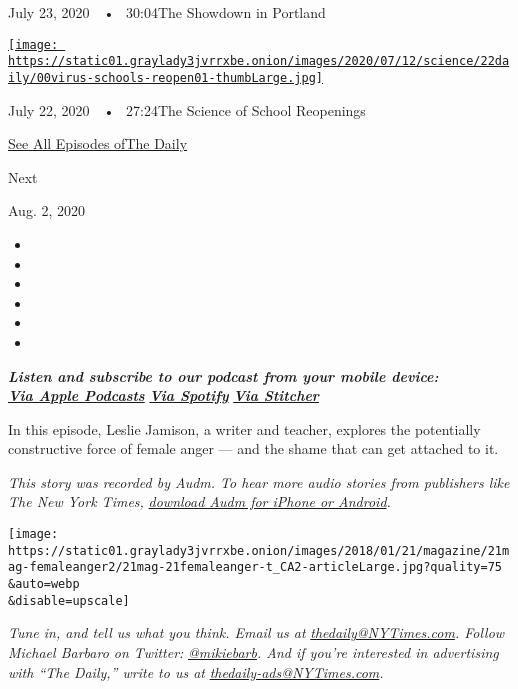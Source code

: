 July 23, 2020~~•~ 30:04The Showdown in Portland

\href{https://www.nytimes3xbfgragh.onion/2020/07/22/podcasts/the-daily/school-reopenings-coronavirus.html?action=click\&module=audio-series-bar\&region=header\&pgtype=Article}{\texttt{[image: https://static01.graylady3jvrrxbe.onion/images/2020/07/12/science/22daily/00virus-schools-reopen01-thumbLarge.jpg]}}

July 22, 2020~~•~ 27:24The Science of School Reopenings

\href{https://www.nytimes3xbfgragh.onion/column/the-daily}{See All
Episodes ofThe Daily}

Next

Aug. 2, 2020

\begin{itemize}
\item
\item
\item
\item
\item
\item
\end{itemize}

\emph{\textbf{Listen and subscribe to our podcast from your mobile
device:}}\\
\textbf{\href{https://itunes.apple.com/us/podcast/the-daily/id1200361736?mt=2}{\emph{Via
Apple Podcasts}}} \emph{\textbf{\textbar{}}}
\textbf{\href{https://open.spotify.com/show/3IM0lmZxpFAY7CwMuv9H4g?si=SfuMSC55R1qprFsRZU3_zw}{\emph{Via
Spotify}}} \emph{\textbf{\textbar{}}}
\textbf{\href{http://www.stitcher.com/podcast/the-new-york-times/the-daily-10}{\emph{Via
Stitcher}}}

In this episode, Leslie Jamison, a writer and teacher, explores the
potentially constructive force of female anger --- and the shame that
can get attached to it.

\emph{This story was recorded by Audm. To hear more audio stories from
publishers like The New York Times,}
\href{https://www.audm.com/?utm_source=nytmag\&utm_medium=embed\&utm_campaign=insist_angry_anymore}{\emph{download
Audm for iPhone or Android}}\emph{.}

\texttt{[image: https://static01.graylady3jvrrxbe.onion/images/2018/01/21/magazine/21mag-femaleanger2/21mag-21femaleanger-t\_CA2-articleLarge.jpg?quality=75\\\&auto=webp\\\&disable=upscale]}

\emph{Tune in, and tell us what you think. Email us at}
\href{mailto:thedaily@NYTimes.com}{\emph{thedaily@NYTimes.com}}\emph{.
Follow Michael Barbaro on Twitter:}
\href{https://twitter.com/mikiebarb}{\emph{@mikiebarb}}\emph{. And if
you're interested in advertising with ``The Daily,'' write to us at}
\href{mailto:thedaily-ads@NYTimes.com}{\emph{thedaily-ads@NYTimes.com}}\emph{.}

